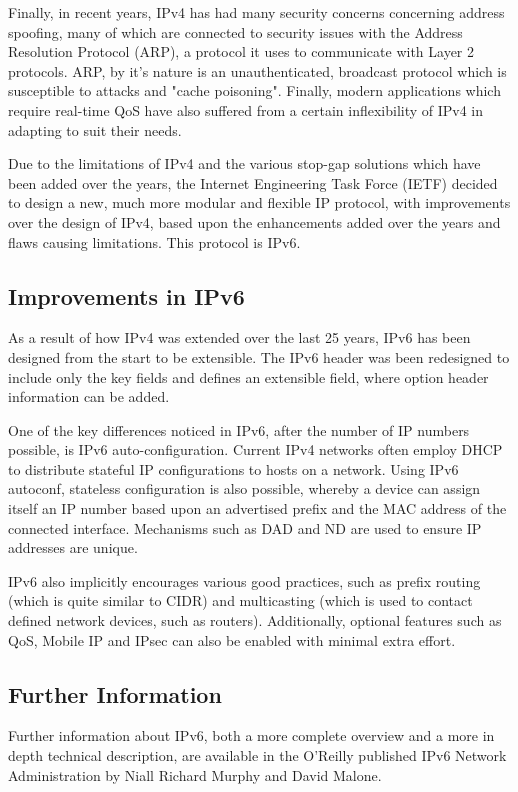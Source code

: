 Finally, in recent years, IPv4 has had many security concerns concerning
address spoofing, many of which are connected to security issues with
the Address Resolution Protocol (ARP), a protocol it uses to communicate
with Layer 2 protocols. ARP, by it's nature is an unauthenticated, 
broadcast protocol which is susceptible to attacks and "cache poisoning".
Finally, modern applications which require real-time QoS have also 
suffered from a certain inflexibility of IPv4 in adapting to suit their 
needs.


Due to the limitations of IPv4 and the various stop-gap solutions which
have been added over the years, the Internet Engineering Task Force
(IETF) decided to design a new, much more modular and flexible IP
protocol, with improvements over the design of IPv4, based upon the
enhancements added over the years and flaws causing limitations. This
protocol is IPv6.

\subsection{Improvements in IPv6}

As a result of how IPv4 was extended over the last 25 years, IPv6 has
been designed from the start to be extensible. The IPv6 header was been
redesigned to include only the key fields and defines an extensible
field, where option header information can be added.


One of the key differences noticed in IPv6, after the number of IP
numbers possible, is IPv6 auto-configuration. Current IPv4 networks often
employ DHCP to distribute stateful IP configurations to hosts on a
network. Using IPv6 autoconf, stateless configuration is also possible,
whereby a device can assign itself an IP number based upon an advertised
prefix and the MAC address of the connected interface. Mechanisms such
as DAD and ND are used to ensure IP addresses are unique.


IPv6 also implicitly encourages various good practices, such as prefix
routing (which is quite similar to CIDR) and multicasting (which is used
to contact defined network devices, such as routers). Additionally, 
optional features such as QoS, Mobile IP and IPsec can also be enabled 
with minimal extra effort.

\subsection{Further Information}

Further information about IPv6, both a more complete overview and
a more in depth technical description, are available in the O'Reilly
published IPv6 Network Administration by Niall Richard Murphy and 
David Malone.
